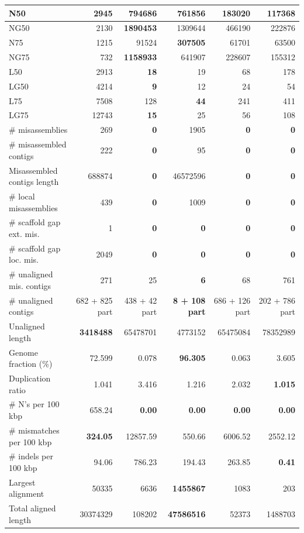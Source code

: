 \documentclass[12pt,a4paper]{article}
\begin{document}
\begin{table}[ht]
\begin{center}
\begin{tabular}{|l*{5}{|r}|}
N50 & 2945 & {\bf 794686} & 761856 & 183020 & 117368 \\ \hline
NG50 & 2130 & {\bf 1890453} & 1309644 & 466190 & 222876 \\ \hline
N75 & 1215 & 91524 & {\bf 307505} & 61701 & 63500 \\ \hline
NG75 & 732 & {\bf 1158933} & 641907 & 228607 & 155312 \\ \hline
L50 & 2913 & {\bf 18} & 19 & 68 & 178 \\ \hline
LG50 & 4214 & {\bf 9} & 12 & 24 & 54 \\ \hline
L75 & 7508 & 128 & {\bf 44} & 241 & 411 \\ \hline
LG75 & 12743 & {\bf 15} & 25 & 56 & 108 \\ \hline
\# misassemblies & 269 & {\bf 0} & 1905 & {\bf 0} & {\bf 0} \\ \hline
\# misassembled contigs & 222 & {\bf 0} & 95 & {\bf 0} & {\bf 0} \\ \hline
Misassembled contigs length & 688874 & {\bf 0} & 46572596 & {\bf 0} & {\bf 0} \\ \hline
\# local misassemblies & 439 & {\bf 0} & 1009 & {\bf 0} & {\bf 0} \\ \hline
\# scaffold gap ext. mis. & 1 & {\bf 0} & {\bf 0} & {\bf 0} & {\bf 0} \\ \hline
\# scaffold gap loc. mis. & 2049 & {\bf 0} & {\bf 0} & {\bf 0} & {\bf 0} \\ \hline
\# unaligned mis. contigs & 271 & 25 & {\bf 6} & 68 & 761 \\ \hline
\# unaligned contigs & 682 + 825 part & 438 + 42 part & {\bf 8 + 108 part} & 686 + 126 part & 202 + 786 part \\ \hline
Unaligned length & {\bf 3418488} & 65478701 & 4773152 & 65475084 & 78352989 \\ \hline
Genome fraction (\%) & 72.599 & 0.078 & {\bf 96.305} & 0.063 & 3.605 \\ \hline
Duplication ratio & 1.041 & 3.416 & 1.216 & 2.032 & {\bf 1.015} \\ \hline
\# N's per 100 kbp & 658.24 & {\bf 0.00} & {\bf 0.00} & {\bf 0.00} & {\bf 0.00} \\ \hline
\# mismatches per 100 kbp & {\bf 324.05} & 12857.59 & 550.66 & 6006.52 & 2552.12 \\ \hline
\# indels per 100 kbp & 94.06 & 786.23 & 194.43 & 263.85 & {\bf 0.41} \\ \hline
Largest alignment & 50335 & 6636 & {\bf 1455867} & 1083 & 203 \\ \hline
Total aligned length & 30374329 & 108202 & {\bf 47586516} & 52373 & 1488703 \\ \hline

\end{tabular}
\end{center}
\end{table}
\end{document}
